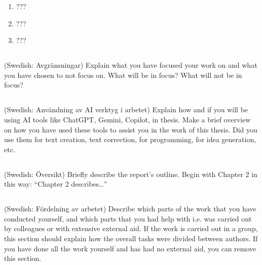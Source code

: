 \begin{enumerate}
  \item {???}
  \item {???}
  \item {???}
\end{enumerate}

\subsection{}
(Swedish: Avgränsningar) Explain what you have focused your work on and what you have chosen to not focus on.  What will be in focus? What will not be in focus?


\subsection{}
(Swedish: Användning av AI verktyg i arbetet) Explain how and if you will be using AI tools like ChatGPT, Gemini, Copilot, in thesis. Make a brief overview on how you have used these tools to assist you in the work of this thesis. Did you use them for text creation, text correction, for programming, for idea generation, etc. 

\subsection{}
(Swedish: Översikt) Briefly describe the report's outline. Begin with Chapter 2 in this way: “Chapter 2 describes\dots”

\subsection{}
(Swedish: Fördelning av arbetet) Describe which parts of the work that you have conducted yourself, and which parts that you had help with i.e. was carried out by colleagues or with extensive external aid. If the work is carried out in a group, this section should explain how the overall tasks were divided between authors. If you have done all the work yourself and has had no external aid, you can remove this section.
